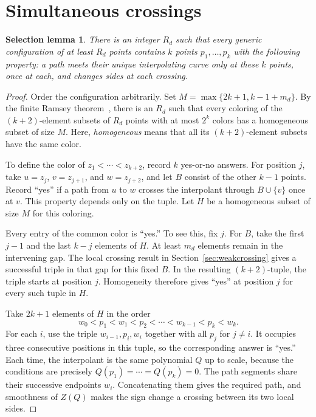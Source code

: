 \documentclass[11pt,letterpaper]{article}
\newtheorem*{selectionlemma}{Selection lemma}
\begin{document}
\section{Simultaneous crossings}\label{sec:weakselection}
\begin{selectionlemma}
There is an integer $R_d$ such that every generic configuration of at least $R_d$ points contains $k$ points $p_1,\ldots,p_k$ with the following property: a path meets their unique interpolating curve only at these $k$ points, once at each, and changes sides at each crossing.
\end{selectionlemma}
\begin{proof}
Order the configuration arbitrarily. Set $M=\max\{2k+1,k-1+m_d\}$. By the finite Ramsey theorem~\cite{ramsey}, there is an $R_d$ such that every coloring of the $(k+2)$-element subsets of $R_d$ points with at most $2^k$ colors has a homogeneous subset of size $M$. Here, \emph{homogeneous} means that all its $(k+2)$-element subsets have the same color.

To define the color of $z_1<\cdots<z_{k+2}$, record $k$ yes-or-no answers. For position $j$, take $u=z_j$, $v=z_{j+1}$, and $w=z_{j+2}$, and let $B$ consist of the other $k-1$ points. Record ``yes'' if a path from $u$ to $w$ crosses the interpolant through $B\cup\{v\}$ once at $v$. This property depends only on the tuple. Let $H$ be a homogeneous subset of size $M$ for this coloring.

Every entry of the common color is ``yes.'' To see this, fix $j$. For $B$, take the first $j-1$ and the last $k-j$ elements of $H$. At least $m_d$ elements remain in the intervening gap. The local crossing result in Section~\ref{sec:weakcrossing} gives a successful triple in that gap for this fixed $B$. In the resulting $(k+2)$-tuple, the triple starts at position $j$. Homogeneity therefore gives ``yes'' at position $j$ for every such tuple in $H$.

Take $2k+1$ elements of $H$ in the order
\[
w_0<p_1<w_1<p_2<\cdots<w_{k-1}<p_k<w_k.
\]
For each $i$, use the triple $w_{i-1},p_i,w_i$ together with all $p_j$ for $j\neq i$. It occupies three consecutive positions in this tuple, so the corresponding answer is ``yes.'' Each time, the interpolant is the same polynomial $Q$ up to scale, because the conditions are precisely $Q(p_1)=\cdots=Q(p_k)=0$. The path segments share their successive endpoints $w_i$. Concatenating them gives the required path, and smoothness of $Z(Q)$ makes the sign change a crossing between its two local sides.
\end{proof}
\end{document}
